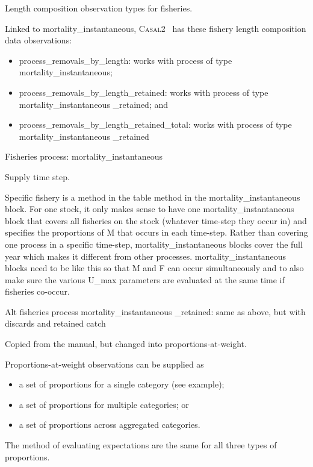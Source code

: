 \documentclass[a4paper,11pt,twoside,pdftex,draft]{article}
\newcommand{\CNAME}{\textsc{Casal2}}
\begin{document}
Length composition observation types for fisheries.


Linked to mortality\_instantaneous, \CNAME~ has these fishery length composition data observations:

\begin{itemize}
	\item process\_removals\_by\_length: works with process of type mortality\_instantaneous;
	\item process\_removals\_by\_length\_retained: works with process of type mortality\_instantaneous \_retained; and
	\item process\_removals\_by\_length\_retained\_total: works with process of type mortality\_instantaneous \_retained
\end{itemize}

Fisheries process: mortality\_instantaneous

Supply time step.

Specific fishery is a method in the table method in the  mortality\_instantaneous block. For one stock, it only makes sense to have one mortality\_instantaneous block that covers all fisheries on the stock (whatever time-step they occur in) and specifies the proportions of M that occurs in each time-step. Rather than covering one process in a specific time-step, mortality\_instantaneous blocks cover the full year which makes it different from other processes. mortality\_instantaneous blocks need to be like this so that M and F can occur simultaneously and to also make sure the various U\_max parameters are evaluated at the same time if fisheries co-occur.

Alt fisheries process mortality\_instantaneous \_retained:  same as above, but with discards and retained catch

Copied from the manual, but changed into proportions-at-weight.

Proportions-at-weight observations can be supplied as

\begin{itemize}
	\item a set of proportions for a single category (see example);
	\item a set of proportions for multiple categories; or
	\item a set of proportions across aggregated categories.
\end{itemize}

The method of evaluating expectations are the same for all three types of proportions.
\end{document}
